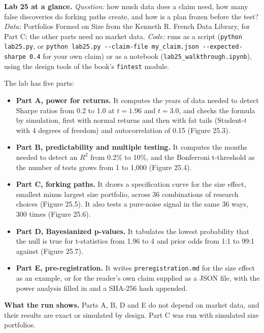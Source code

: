 \begin{callout}
\textbf{Lab 25 at a glance.} \emph{Question:} how much data does a claim need, how many false discoveries do forking paths create, and how is a plan frozen before the test? \emph{Data:} Portfolios Formed on Size from the Kenneth R. French Data Library, for Part C; the other parts need no market data. \emph{Code:} runs as a script (\texttt{python lab25.py}, or \texttt{python lab25.py -{}-claim-file my\_claim.json -{}-expected-sharpe 0.4} for your own claim) or as a notebook (\texttt{lab25\_walkthrough.ipynb}), using the design tools of the book's \texttt{fintest} module.
\end{callout}

The lab has five parts:

\begin{itemize}
  \item \textbf{Part A, power for returns.} It computes the years of data needed to detect Sharpe ratios from 0.2 to 1.0 at $t = 1.96$ and $t = 3.0$, and checks the formula by simulation, first with normal returns and then with fat tails (Student-$t$ with 4 degrees of freedom) and autocorrelation of 0.15 (Figure 25.3).
  \item \textbf{Part B, predictability and multiple testing.} It computes the months needed to detect an $R^2$ from 0.2\% to 10\%, and the Bonferroni t-threshold as the number of tests grows from 1 to 1,000 (Figure 25.4).
  \item \textbf{Part C, forking paths.} It draws a specification curve for the size effect, smallest minus largest size portfolio, across 36 combinations of research choices (Figure 25.5). It also tests a pure-noise signal in the same 36 ways, 300 times (Figure 25.6).
  \item \textbf{Part D, Bayesianized p-values.} It tabulates the lowest probability that the null is true for t-statistics from 1.96 to 4 and prior odds from 1:1 to 99:1 against (Figure 25.7).
  \item \textbf{Part E, pre-registration.} It writes \texttt{preregistration.md} for the size effect as an example, or for the reader's own claim supplied as a JSON file, with the power analysis filled in and a SHA-256 hash appended.
\end{itemize}

\textbf{What the run shows.} Parts A, B, D and E do not depend on market data, and their results are exact or simulated by design. Part C was run with simulated size portfolios.

